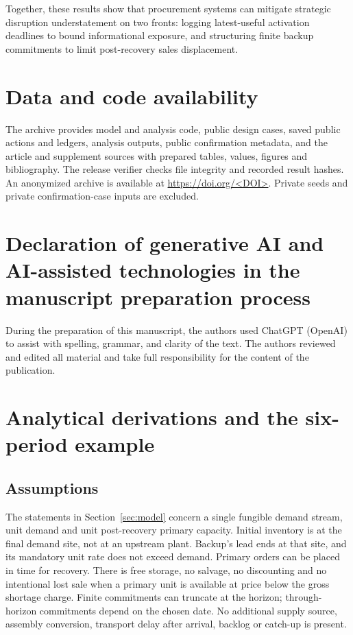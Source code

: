 \documentclass[preprint,11pt,authoryear]{elsarticle}
\begin{document}
Together, these results show that procurement systems can mitigate strategic disruption understatement on two fronts: logging latest-useful activation deadlines to bound informational exposure, and structuring finite backup commitments to limit post-recovery sales displacement.

\section*{Data and code availability}
The archive provides model and analysis code, public design cases, saved public actions and ledgers, analysis outputs, public confirmation metadata, and the article and supplement sources with prepared tables, values, figures and bibliography. The release verifier checks file integrity and recorded result hashes. An anonymized archive is available at \url{https://doi.org/<DOI>}. Private seeds and private confirmation-case inputs are excluded.
\section*{Declaration of generative AI and AI-assisted technologies in the manuscript preparation process}
During the preparation of this manuscript, the authors used ChatGPT (OpenAI) to assist with spelling, grammar, and clarity of the text. The authors reviewed and edited all material and take full responsibility for the content of the publication.


\clearpage\appendix
\section{Analytical derivations and the six-period example}\label{app:proof}
\subsection{Assumptions}
The statements in Section~\ref{sec:model} concern a single fungible demand stream, unit demand and unit post-recovery primary capacity. Initial inventory is at the final demand site, not at an upstream plant. Backup's lead ends at that site, and its mandatory unit rate does not exceed demand. Primary orders can be placed in time for recovery. There is free storage, no salvage, no discounting and no intentional lost sale when a primary unit is available at price below the gross shortage charge. Finite commitments can truncate at the horizon; through-horizon commitments depend on the chosen date. No additional supply source, assembly conversion, transport delay after arrival, backlog or catch-up is present.
\end{document}
